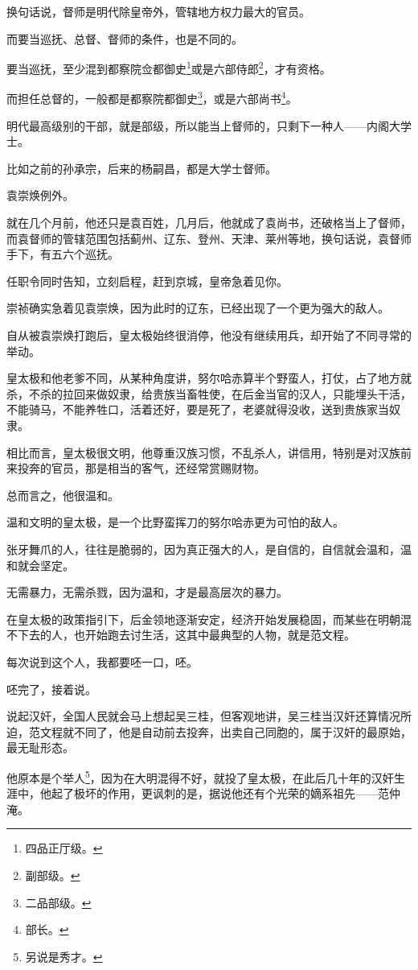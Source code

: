 \begin{multicols}{\theparacolNo}
		换句话说，督师是明代除皇帝外，管辖地方权力最大的官员。

		而要当巡抚、总督、督师的条件，也是不同的。

		要当巡抚，至少混到都察院佥都御史\footnote{四品正厅级。}或是六部侍郎\footnote{副部级。}，才有资格。

		而担任总督的，一般都是都察院都御史\footnote{二品部级。}，或是六部尚书\footnote{部长。}。

		明代最高级别的干部，就是部级，所以能当上督师的，只剩下一种人——内阁大学士。

		比如之前的孙承宗，后来的杨嗣昌，都是大学士督师。

		袁崇焕例外。

		就在几个月前，他还只是袁百姓，几月后，他就成了袁尚书，还破格当上了督师，而袁督师的管辖范围包括蓟州、辽东、登州、天津、莱州等地，换句话说，袁督师手下，有五六个巡抚。

		任职令同时告知，立刻启程，赶到京城，皇帝急着见你。

		崇祯确实急着见袁崇焕，因为此时的辽东，已经出现了一个更为强大的敌人。

		自从被袁崇焕打跑后，皇太极始终很消停，他没有继续用兵，却开始了不同寻常的举动。

		皇太极和他老爹不同，从某种角度讲，努尔哈赤算半个野蛮人，打仗，占了地方就杀，不杀的拉回来做奴隶，给贵族当畜牲使，在后金当官的汉人，只能埋头干活，不能骑马，不能养牲口，活着还好，要是死了，老婆就得没收，送到贵族家当奴隶。

		相比而言，皇太极很文明，他尊重汉族习惯，不乱杀人，讲信用，特别是对汉族前来投奔的官员，那是相当的客气，还经常赏赐财物。

		总而言之，他很温和。

		温和文明的皇太极，是一个比野蛮挥刀的努尔哈赤更为可怕的敌人。

		张牙舞爪的人，往往是脆弱的，因为真正强大的人，是自信的，自信就会温和，温和就会坚定。

		无需暴力，无需杀戮，因为温和，才是最高层次的暴力。

		在皇太极的政策指引下，后金领地逐渐安定，经济开始发展稳固，而某些在明朝混不下去的人，也开始跑去讨生活，这其中最典型的人物，就是范文程。

		每次说到这个人，我都要呸一口，呸。

		呸完了，接着说。

		说起汉奸，全国人民就会马上想起吴三桂，但客观地讲，吴三桂当汉奸还算情况所迫，范文程就不同了，他是自动前去投奔，出卖自己同胞的，属于汉奸的最原始，最无耻形态。

		他原本是个举人\footnote{另说是秀才。}，因为在大明混得不好，就投了皇太极，在此后几十年的汉奸生涯中，他起了极坏的作用，更讽刺的是，据说他还有个光荣的嫡系祖先——范仲淹。


\end{multicols}
